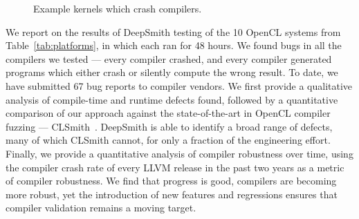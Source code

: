 \begin{figure}
  \centering %
  \\%
  \\%
  \\%
  \\%
  \\%
  \caption{Example kernels which crash compilers.}%
  \vspace{-1.1em}
\end{figure}

\noindent
We report on the results of DeepSmith testing of the 10 OpenCL systems from
Table~\ref{tab:platforms}, in which each ran for 48 hours. We found bugs in all
the compilers we tested --- every compiler crashed, and every compiler generated
programs which either crash or silently compute the wrong result. To date, we
have submitted 67 bug reports to compiler vendors. We first provide a
qualitative analysis of compile-time and runtime defects found, followed by a
quantitative comparison of our approach against the state-of-the-art in OpenCL
compiler fuzzing --- CLSmith~\cite{Lidbury2015a}. DeepSmith is able to identify
a broad range of defects, many of which CLSmith cannot, for only a fraction of
the engineering effort. Finally, we provide a quantitative analysis of compiler
robustness over time, using the compiler crash rate of every LLVM release in the
past two years as a metric of compiler robustness. We find that progress is
good, compilers are becoming more robust, yet the introduction of new features
and regressions ensures that compiler validation remains a moving target.

